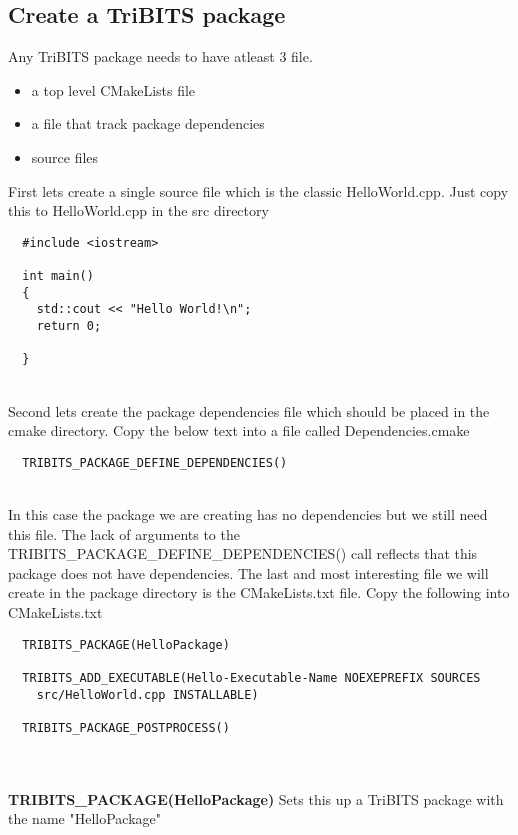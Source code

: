 \documentclass[12pt]{article}
\begin{document}
\subsection*{Create a TriBITS package}


Any TriBITS package needs to have atleast 3 file.
\begin{itemize}
\item a top level CMakeLists file
\item a file that track package dependencies
\item source files
\end{itemize}

First lets create a single source file which is the classic
HelloWorld.cpp.  Just copy this to HelloWorld.cpp in the src directory

\begin{verbatim}
  #include <iostream>

  int main()
  {
    std::cout << "Hello World!\n";
    return 0;

  }
\end{verbatim}\\

Second lets create the package dependencies file which should be
placed in the cmake directory.  Copy the below text into a file called
Dependencies.cmake

\begin{verbatim}
  TRIBITS_PACKAGE_DEFINE_DEPENDENCIES()
\end{verbatim}\\

In this case the package we are creating has no dependencies but we
still need this file.  The lack of arguments to the
TRIBITS\_PACKAGE\_DEFINE\_DEPENDENCIES() call reflects that this
package does not have dependencies.  The last and most interesting
file we will create in the package directory is the CMakeLists.txt
file.  Copy the following into CMakeLists.txt

\begin{verbatim}
  TRIBITS_PACKAGE(HelloPackage)
  
  TRIBITS_ADD_EXECUTABLE(Hello-Executable-Name NOEXEPREFIX SOURCES
    src/HelloWorld.cpp INSTALLABLE)
  
  TRIBITS_PACKAGE_POSTPROCESS()
\end{verbatim}\\

\textbf{\\TRIBITS\_PACKAGE(HelloPackage)} Sets this up a TriBITS package
with the name "HelloPackage"
\end{document}
